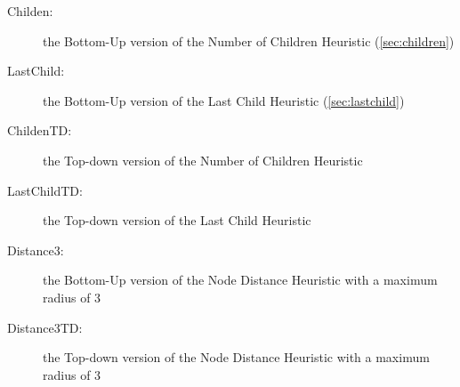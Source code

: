 \documentclass{llncs}
\begin{document}
\begin{description}
  \item[Childen:] the Bottom-Up version of the Number of Children Heuristic (\ref{sec:children})
  \item[LastChild:] the Bottom-Up version of the Last Child Heuristic (\ref{sec:lastchild})
	\item[ChildenTD:] the Top-down version of the Number of Children Heuristic
  \item[LastChildTD:] the Top-down version of the Last Child Heuristic
	\item[Distance3:] the Bottom-Up version of the Node Distance Heuristic with a maximum radius of 3
  \item[Distance3TD:] the Top-down version of the Node Distance Heuristic with a maximum radius of 3

\end{description}
\end{document}
